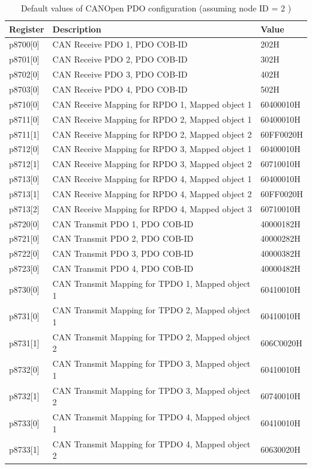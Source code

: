\begin{table}[!h]
	\centering
	\begin{tabular}{lll}
		\toprule
		\textbf{Register} & Description & Value\\
		\midrule
		p8700[0] & CAN Receive PDO 1, PDO COB-ID & 202H \\ 
		p8701[0] & CAN Receive PDO 2, PDO COB-ID & 302H \\
		p8702[0] & CAN Receive PDO 3, PDO COB-ID & 402H \\
		p8703[0] & CAN Receive PDO 4, PDO COB-ID & 502H \\
		\midrule
		p8710[0] & CAN Receive Mapping for RPDO 1, Mapped object 1 & 60400010H \\
		p8711[0] & CAN Receive Mapping for RPDO 2, Mapped object 1 & 60400010H \\
		p8711[1] & CAN Receive Mapping for RPDO 2, Mapped object 2 & 60FF0020H \\
		p8712[0] & CAN Receive Mapping for RPDO 3, Mapped object 1 & 60400010H \\
		p8712[1] & CAN Receive Mapping for RPDO 3, Mapped object 2 & 60710010H \\
		p8713[0] & CAN Receive Mapping for RPDO 4, Mapped object 1 & 60400010H \\
		p8713[1] & CAN Receive Mapping for RPDO 4, Mapped object 2 & 60FF0020H \\
		p8713[2] & CAN Receive Mapping for RPDO 4, Mapped object 3 & 60710010H \\
		\midrule
		p8720[0] & CAN Transmit PDO 1, PDO COB-ID & 40000182H \\
		p8721[0] & CAN Transmit PDO 2, PDO COB-ID & 40000282H \\
		p8722[0] & CAN Transmit PDO 3, PDO COB-ID & 40000382H \\
		p8723[0] & CAN Transmit PDO 4, PDO COB-ID & 40000482H \\
		\midrule
		p8730[0] & CAN Transmit Mapping for TPDO 1, Mapped object 1 & 60410010H \\
		p8731[0] & CAN Transmit Mapping for TPDO 2, Mapped object 1 & 60410010H \\
		p8731[1] & CAN Transmit Mapping for TPDO 2, Mapped object 2 & 606C0020H \\
		p8732[0] & CAN Transmit Mapping for TPDO 3, Mapped object 1 & 60410010H \\
		p8732[1] & CAN Transmit Mapping for TPDO 3, Mapped object 2 & 60740010H \\
		p8733[0] & CAN Transmit Mapping for TPDO 4, Mapped object 1 & 60410010H \\
		p8733[1] & CAN Transmit Mapping for TPDO 4, Mapped object 2 & 60630020H \\
	\end{tabular}
	\caption{Default values of CANOpen PDO configuration (assuming node ID = 2 )}
	\label{tab:default_PDO}
\end{table}

